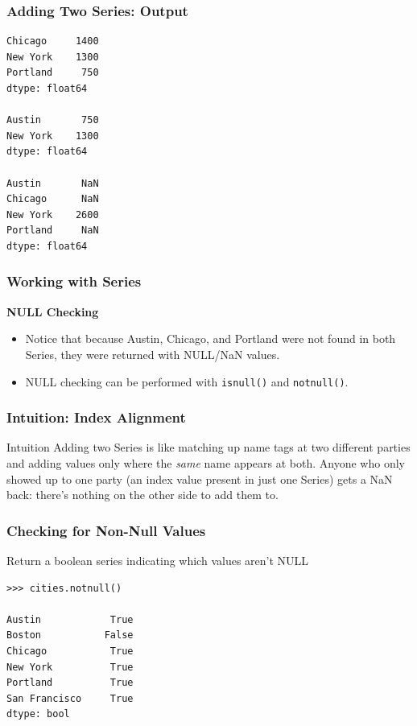 \begin{frame}[fragile]\frametitle{Adding Two Series: Output}
\begin{lstlisting}
Chicago     1400
New York    1300
Portland     750
dtype: float64

Austin       750
New York    1300
dtype: float64

Austin       NaN
Chicago      NaN
New York    2600
Portland     NaN
dtype: float64
\end{lstlisting}
\end{frame}

\begin{frame}[fragile]\frametitle{Working with Series}
\textbf{NULL Checking}
\begin{itemize}
\item Notice that because Austin, Chicago, and Portland were not found in both Series, they were returned with NULL/NaN values.
\item NULL checking can be performed with \texttt{isnull()} and \texttt{notnull()}.
\end{itemize}
\end{frame}

\begin{frame}[fragile]\frametitle{Intuition: Index Alignment}
\begin{block}{Intuition}
Adding two Series is like matching up name tags at two different parties and adding values only
where the \emph{same} name appears at both. Anyone who only showed up to one party (an index
value present in just one Series) gets a NaN back: there's nothing on the other side to add
them to.
\end{block}
\end{frame}

\begin{frame}[fragile]\frametitle{Checking for Non-Null Values}
Return a boolean series indicating which values aren't NULL
\begin{lstlisting}
>>> cities.notnull()

Austin            True
Boston           False
Chicago           True
New York          True
Portland          True
San Francisco     True
dtype: bool
\end{lstlisting}
\end{frame}

